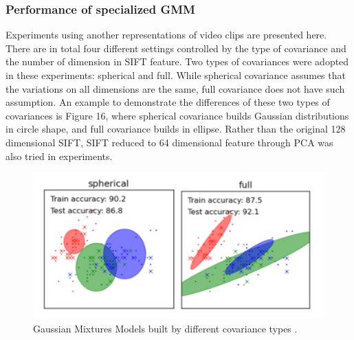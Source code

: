 \subsubsection{Performance of specialized GMM}
\begin{table}[!ht]
  \begin{center}
    \end{center}
    \caption{Means and standard deviations (percent) of MAPs over six events using different GMMs}
\end{table}
\noindent Experiments using another representations of video clips are presented here. There are in total four different settings controlled by the type of covariance and the number of dimension in SIFT feature. Two types of covariances were adopted in these experiments: spherical and full. While spherical covariance assumes that the variations on all dimensions are the same, full covariance does not have such assumption. An example to demonstrate the differences of these two types of covariances is Figure 16, where spherical covariance builds Gaussian distributions in circle shape, and full covariance builds in ellipse. Rather than the original 128 dimensional SIFT, SIFT reduced to 64 dimensional feature through PCA was also tried in experiments. \\ 

\begin{figure}[!ht]
\centering
  \includegraphics[scale = 0.6]{./DifCov.png}
\caption{Gaussian Mixtures Models built by different covariance types \cite{scikit-learn}.}
\end{figure}

